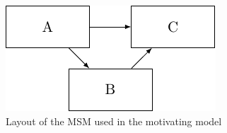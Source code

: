 \documentclass[
]{article}
\begin{document}
\begin{figure}[h]

{\centering \includegraphics{test_files/figure-latex/ThreeStateDiagram-1} 

}

\caption{Layout of the MSM used in the motivating model}\label{fig:ThreeStateDiagram}
\end{figure}
\end{document}
